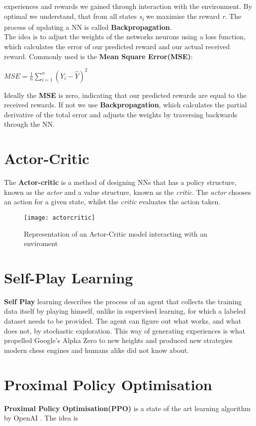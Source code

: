 experiences and rewards we gained through interaction with the environment.
By optimal we understand, that from all states \textit{s\textsubscript{i}} we maximise the reward \textit{r}.
\newline
The process of updating a NN is called \textbf{Backpropagation}.\\
The idea is to adjust the weights of the networks neurons using a loss function, which calculates the error of our
predicted reward and our actual received reward.
Commonly used is the \textbf{Mean Square Error(MSE)}:
\begin{center}
    \begin{math}
        \boxed{
            MSE = \frac{1}{n} \sum_{i=1}^n(Y_{i}-\hat Y)^2
        }
    \end{math}
\end{center}
Ideally the \textbf{MSE} is zero, indicating that our predicted rewards are equal to the received rewards.
If not we use \textbf{Backpropagation}, which calculates the partial derivative of the total error and adjusts the
weights by traversing backwards through the NN.


\section{Actor-Critic}
The \textbf{Actor-critic} is a method of designing NNs that has a policy structure, known as the \textit{actor}
and a value structure, known as the \textit{critic}.
The \textit{actor} chooses an action for a given state, whilst the \textit{critic} evaluates the action taken.
\begin{figure}[!ht]
    \centering
    \texttt{[image: actorcritic]}
    \caption{Representation of an Actor-Critic model interacting with an enviroment \cite{actorcritic}}
\end{figure}


\section{Self-Play Learning}
\textbf{Self Play} learning describes the process of an agent that collects the training data itself by playing
himself, unlike in supervised learning, for which a labeled dataset needs to be provided.
The agent can figure out what works, and what does not, by stochastic exploration.
This way of generating experiences is what propelled Google's Alpha Zero to new heights and produced new strategies
modern chess engines and humans alike did not know about.\cite{Silver2017}


\section{Proximal Policy Optimisation}
\textbf{Proximal Policy Optimisation(PPO)} is a state of the art learning algorithm by OpenAI
.\cite{schulman2017proximal}
The idea is
